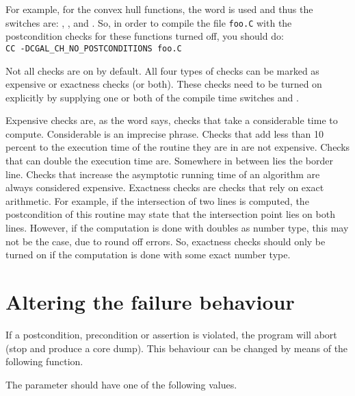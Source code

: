 For example, for the convex hull functions, the word
 is used and thus the switches are:
, 
,
 and 
.
So, in order to compile the file \verb~foo.C~ with the postcondition checks
for these functions turned off, you should do:\\
\verb~CC -DCGAL_CH_NO_POSTCONDITIONS foo.C~

Not all checks are on by default.
All four types of checks can be marked as expensive or exactness checks
(or both).
These checks need to be turned on explicitly by supplying one or both of
the compile time switches  and 
.

Expensive checks are, as the word says, checks that take a considerable
time to compute. Considerable is an imprecise phrase. 
Checks that add less than 10 percent to the execution time of the routine 
they are in are not expensive.  Checks that can double the execution time are. 
Somewhere in between lies the border line.
Checks that increase the asymptotic running time of an algorithm are always 
considered expensive.
Exactness checks are checks that rely on exact arithmetic. 
For example, if the intersection of two lines is computed, the postcondition 
of this routine may state that the intersection point lies on both lines. 
However, if the computation is done with doubles as number type, this may not 
be the case, due to round off errors. 
So, exactness checks should only be turned on if the computation is done 
with some exact number type.

\section{Altering the failure behaviour}

If a postcondition, precondition or assertion is
violated, the program will abort (stop and produce a core dump).
This behaviour can be changed by means of the following function.


\ccGlueBegin
{}
\ccGlueEnd

The parameter should have one of the following values.

